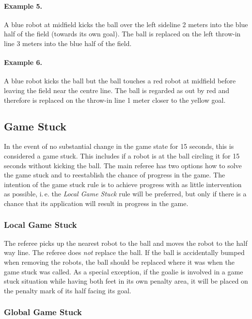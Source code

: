 \documentclass[12pt]{article}
\newcommand{\ie}{\mbox{i.\,e.}\xspace}
\begin{document}
\paragraph{Example 5.} A blue robot at midfield kicks the ball over the left sideline 2 meters into the blue half of the field (towards its own goal). The ball is replaced on the left throw-in line 3 meters into the blue half of the field.

\paragraph{Example 6.} A blue robot kicks the ball but the ball touches a red robot at midfield before leaving the field near the centre line. The ball is regarded as out by red and therefore is replaced on the throw-in line 1 meter closer to the yellow goal.


\subsection{Game Stuck}
\label{sec:game_stuck}

In the event of no substantial change in the game state for 15 seconds, this is considered a game stuck. 
This includes if a robot is at the ball circling it for 15 seconds without kicking the ball.
The main referee has two options how to solve the game stuck and to reestablish the chance of progress in the game. The intention of the game stuck rule is to achieve progress with as little intervention as possible, \ie the \emph{Local Game Stuck} rule will be preferred, but only if there is a chance that its application will result in progress in the game.

\subsubsection{Local Game Stuck}

The referee picks up the nearest robot to the ball and moves the robot to the half way line. The referee does \emph{not} replace the ball. If the ball is accidentally bumped when removing the robots, the ball should be replaced where it was when the game stuck was called. As a special exception, if the goalie is involved in a game stuck situation while having both feet in its own penalty area, it will be placed on the penalty mark of its half facing its goal.

\subsubsection{Global Game Stuck}
\end{document}
